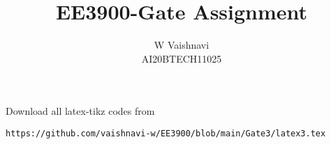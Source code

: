 \documentclass[journal,12pt,twocolumn]{IEEEtran}
\DeclareMathOperator*{\Res}{Res}
\begin{document}
\newtheorem{lemma}{Lemma}[section]
\newcommand{\BEQA}{\begin{eqnarray}}
\newcommand{\EEQA}{\end{eqnarray}}
\newcommand{\define}{\stackrel{\triangle}{=}}

\raggedbottom
\setlength{\parindent}{0pt}
\providecommand{\mbf}{\mathbf}
\providecommand{\pr}[1]{\ensuremath{\Pr\left(#1\right)}}
\providecommand{\qfunc}[1]{\ensuremath{Q\left(#1\right)}}
\providecommand{\sbrak}[1]{\ensuremath{{}\left[#1\right]}}
\providecommand{\lsbrak}[1]{\ensuremath{{}\left[#1\right.}}
\providecommand{\rsbrak}[1]{\ensuremath{{}\left.#1\right]}}
\providecommand{\brak}[1]{\ensuremath{\left(#1\right)}}
\providecommand{\lbrak}[1]{\ensuremath{\left(#1\right.}}
\providecommand{\rbrak}[1]{\ensuremath{\left.#1\right)}}
\providecommand{\cbrak}[1]{\ensuremath{\left\{#1\right\}}}
\providecommand{\lcbrak}[1]{\ensuremath{\left\{#1\right.}}
\providecommand{\rcbrak}[1]{\ensuremath{\left.#1\right\}}}
\theoremstyle{remark}
\newtheorem{rem}{Remark}
\newcommand{\sgn}{\mathop{\mathrm{sgn}}}
\providecommand{\abs}[1]{\vert#1\vert}
\providecommand{\res}[1]{\Res\displaylimits_{#1}} 
\providecommand{\norm}[1]{\lVert#1\rVert}
\providecommand{\sinc}{sinc}
\providecommand{\mtx}[1]{\mathbf{#1}}
\providecommand{\mean}[1]{E[ #1 ]}
\providecommand{\fourier}{\overset{\mathcal{F}}{ \rightleftharpoons}}
\providecommand{\system}{\overset{\mathcal{H}}{ \longleftrightarrow}}
\newcommand{\solution}{\noindent \textbf{Solution: }}
\newcommand{\cosec}{\,\text{cosec}\,}
\providecommand{\dec}[2]{\ensuremath{\overset{#1}{\underset{#2}{\gtrless}}}}
\newcommand{\myvec}[1]{\ensuremath{\begin{pmatrix}#1\end{pmatrix}}}
\newcommand{\mydet}[1]{\ensuremath{\begin{vmatrix}#1\end{vmatrix}}}
\makeatletter
{}
\makeatother
\let\StandardTheFigure\thefigure
\let\vec\mathbf
\renewcommand{\thefigure}{\theproblem}
\def\putbox#1#2#3{\makebox[0in][l]{\makebox[#1][l]{}\raisebox{\baselineskip}[0in][0in]{\raisebox{#2}[0in][0in]{#3}}}}
     \def\rightbox#1{\makebox[0in][r]{#1}}
     \def\centbox#1{\makebox[0in]{#1}}
     \def\topbox#1{\raisebox{-\baselineskip}[0in][0in]{#1}}
     \def\midbox#1{\raisebox{-0.5\baselineskip}[0in][0in]{#1}}
\vspace{3cm}
\title{EE3900-Gate Assignment}
\author{W Vaishnavi\\AI20BTECH11025}
\maketitle
\newpage
\bigskip
\renewcommand{\thefigure}{\theenumi}
\renewcommand{\thetable}{\theenumi}
Download all latex-tikz codes from 
%
\begin{lstlisting}
https://github.com/vaishnavi-w/EE3900/blob/main/Gate3/latex3.tex
\end{lstlisting}
\end{document}
